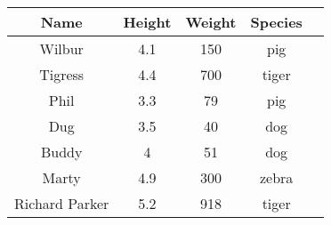 
\begin{center}
\begin{tabular}{|c|c|c|c|c|}
 \hline
 \textbf{Name} & \textbf{Height} & \textbf{Weight} & \textbf{Species} \\
 \hline
 Wilbur & 4.1 & 150 & pig \\
 \hline
 Tigress & 4.4 & 700 & tiger \\
 \hline
 Phil & 3.3 & 79 & pig \\
 \hline
 Dug & 3.5 & 40 & dog \\
 \hline
 Buddy & 4 & 51 & dog \\
 \hline
 Marty & 4.9 & 300 & zebra \\
 \hline
 Richard Parker & 5.2 & 918 & tiger \\
 \hline
\end{tabular}
\end{center}
